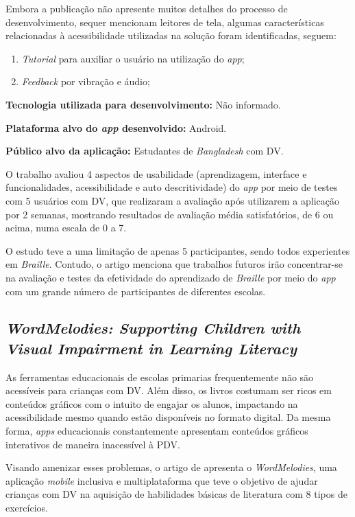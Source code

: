 Embora a publicação não apresente muitos detalhes do processo de desenvolvimento, sequer
mencionam leitores de tela, algumas características relacionadas à acessibilidade utilizadas na solução foram identificadas, seguem:

\begin{enumerate}
    \item \emph{Tutorial} para auxiliar o usuário na utilização do \emph{app};
    \item \emph{Feedback} por vibração e áudio;
\end{enumerate}

\textbf{Tecnologia utilizada para desenvolvimento:} Não informado.

\textbf{Plataforma alvo do \emph{app} desenvolvido:} Android.

\textbf{Público alvo da aplicação:} Estudantes de \emph{Bangladesh} com DV\@.

O trabalho avaliou 4 aspectos de usabilidade (aprendizagem, interface e funcionalidades, acessibilidade e auto descritividade)
do \emph{app} por meio de testes com 5 usuários com DV, que realizaram a avaliação após utilizarem a aplicação por 2 semanas,
mostrando resultados de avaliação média satisfatórios, de 6 ou acima, numa escala de 0 a 7.

O estudo teve a uma limitação de apenas 5 participantes, sendo todos experientes em \emph{Braille}.
Contudo, o artigo menciona que trabalhos futuros irão concentrar-se na avaliação e testes da efetividade do
aprendizado de \emph{Braille} por meio do \emph{app} com um grande número de participantes de diferentes escolas.

\subsection{\emph{WordMelodies: Supporting Children with Visual Impairment in Learning Literacy}}

As ferramentas educacionais de escolas primarias frequentemente não são acessíveis para crianças com DV\@.
Além disso, os livros costumam ser ricos em conteúdos gráficos com o intuito de engajar os alunos, impactando na acessibilidade mesmo quando estão disponíveis no formato digital.
Da mesma forma, \emph{apps} educacionais constantemente apresentam conteúdos gráficos interativos de maneira inacessível à PDV\@.

Visando amenizar esses problemas, o artigo de  apresenta o \emph{WordMelodies}, uma aplicação \emph{mobile}
inclusiva e multiplataforma que teve o objetivo de ajudar crianças com DV na aquisição de habilidades básicas de literatura com 8
tipos de exercícios.

